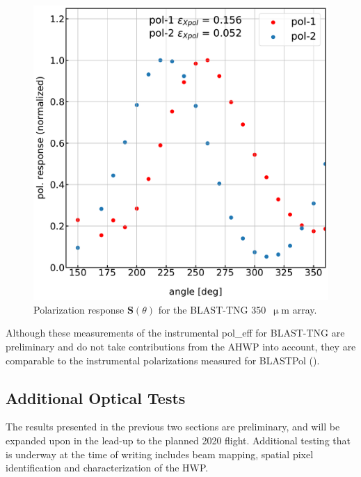 \begin{figure}[!htbp]
\centering
\includegraphics[width=\textwidth]{figures/blast_data/polarization/350_poleff}
\caption{Polarization response $\mathbf{S}(\theta)$ for the BLAST-TNG 350~$\upmu$m array. }
\label{fig:350 pol}
\end{figure}

Although these measurements of the instrumental \gls{pol_eff} for BLAST-TNG are preliminary and do not take contributions from the AHWP into account, they are comparable to the instrumental polarizations measured for BLASTPol (\citet{shariff2015polarimetry}).

\subsection{Additional Optical Tests}\label{more testing}

The results presented in the previous two sections are preliminary, and will be expanded upon in the lead-up to the planned 2020 flight. Additional testing that is underway at the time of writing includes beam mapping, spatial pixel identification and characterization of the HWP\@.

